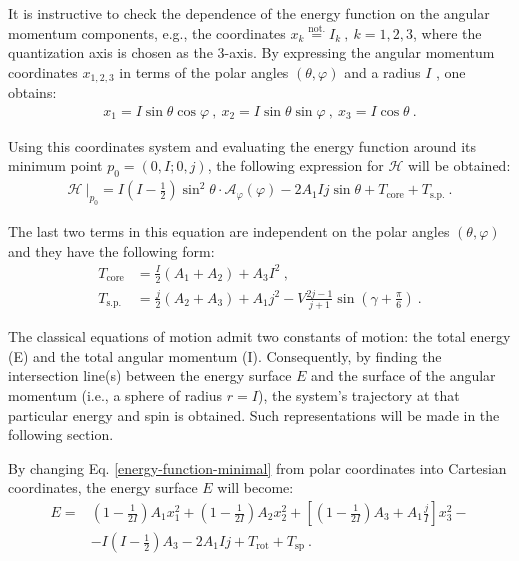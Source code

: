 \documentclass[myclassdoc,debug]{rjparticle}
\begin{document}
It is instructive to check the dependence of the energy function on the angular momentum components, e.g., the coordinates $x_k\overset{\mathrm{not.}}{=}I_k\ ,\ k=1,2,3$, where the quantization axis is chosen as the 3-axis. By expressing the angular momentum coordinates $x_{1,2,3}$ in terms of the polar angles $(\theta,\varphi)$ and a radius $I$ , one obtains: 
\begin{align}
    x_1=I\sin\theta\cos\varphi\ ,\ x_2=I\sin\theta\sin\varphi\ ,\ x_3=I\cos\theta\ .
    \label{coordinate-parametrization}
\end{align}

Using this coordinates system and evaluating the energy function around its minimum point $p_0=(0,I;0,j)$, the following expression for $\mathcal{H}$ will be obtained:
\begin{align}
    \left. \mathcal{H}\ \right\vert_{p_0}=I\left(I-\frac{1}{2}\right)\sin^2\theta\cdot\mathcal{A}_\varphi(\varphi)-2A_1Ij\sin\theta+T_\text{core}+T_\text{s.p.}\ .
    \label{energy-function-minimal}
\end{align}

The last two terms in this equation are independent on the polar angles $(\theta,\varphi)$ and they have the following form:
\begin{align}
    T_\text{core}&=\frac{I}{2}(A_1+A_2)+A_3I^2\ ,\nonumber \\
    T_\text{s.p.}&=\frac{j}{2}(A_2+A_3)+A_1j^2-V\frac{2j-1}{j+1}\sin\left(\gamma+\frac{\pi}{6}\right)\ .
    \label{energyfunction-core-single-particle-subterms}
\end{align}

The classical equations of motion admit two constants of motion: the total energy (E) and the total angular momentum (I).  Consequently, by finding the intersection line(s) between the energy surface $E$ and the surface of the angular momentum (i.e., a sphere of radius $r=I$), the system's trajectory at that particular energy and spin is obtained. Such representations will be made in the following section.

By changing Eq. \ref{energy-function-minimal} from polar coordinates into Cartesian coordinates, the energy surface $E$ will become:
\begin{align}
    E=&\left(1-\frac{1}{2I}\right)A_1x_1^2+\left(1-\frac{1}{2I}\right)A_2x_2^2+\left[\left(1-\frac{1}{2I}\right)A_3+A_1\frac{j}{I}\right]x_3^2-\nonumber\\
    &-I\left(I-\frac{1}{2}\right)A_3-2A_1Ij+T_\text{rot}+T_\text{sp}\ .
    \label{energy-ellipsoid-cartesian}
\end{align}
\end{document}
